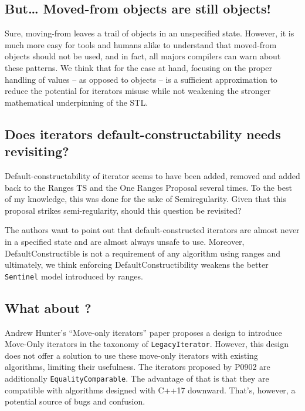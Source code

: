 \documentclass{wg21}
\begin{document}
\hypertarget{but-moved-from-objects-are-still-objects}{%
	\subsection{But\ldots{} Moved-from objects are still
		objects!}\label{but-moved-from-objects-are-still-objects}}

Sure, moving-from leaves a trail of objects in an unspecified state.
However, it is much more easy for tools and humans alike to understand
that moved-from objects should not be used, and in fact, all majors
compilers can warn about these patterns. We think that for the case at
hand, focusing on the proper handling of values -- as opposed to objects
-- is a sufficient approximation to reduce the potential for iterators
misuse while not weakening the stronger mathematical underpinning of the
STL.

\hypertarget{does-iterators-default-constructability-needs-revisiting}{%
	\subsection{Does iterators default-constructability needs
		revisiting?}\label{does-iterators-default-constructability-needs-revisiting}}

Default-constructability of iterator seems to have been added, removed
and added back to the Ranges TS and the One Ranges Proposal several
times. To the best of my knowledge, this was done for the sake of
Semiregularity. Given that this proposal strikes semi-regularity, should
this question be revisited?

The authors want to point out that default-constructed iterators are
almost never in a specified state and are almost always unsafe to use.
Moreover, DefaultConstructible is not a requirement of any algorithm
using ranges and ultimately, we think enforcing DefaultConstructibility
weakens the better \texttt{Sentinel} model introduced by ranges.

\hypertarget{what-about-p0902r0}{%
	\subsection{What about \cite{P0902}?}\label{what-about-p0902r0}}

Andrew Hunter's ``Move-only iterators'' paper proposes a design to
introduce Move-Only iterators in the taxonomy of
\texttt{LegacyIterator}. However, this design does not offer a solution
to use these move-only iterators with existing algorithms, limiting
their usefulness. The iterators proposed by P0902 are additionally
\texttt{EqualityComparable}. The advantage of that is that they are
compatible with algorithms designed with C++17 downward. That's,
however, a potential source of bugs and confusion.
\end{document}
